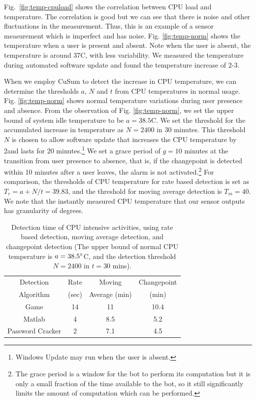 Fig.~\ref{fig:temp-cpuload} shows the correlation between CPU load
and temperature.
The correlation is good but we can see that there is
noise and other fluctuations in the measurement.
Thus, this is an example of a sensor measurement which is imperfect and
has noise.
Fig. \ref{fig:temp-norm} shows the temperature when a user
is present and absent. Note when the user is absent, the temperature
is around 37\degree C, with less variability.  We measured the
temperature during automated software update and found the
temperature increase of 2-3\degree.

When we employ CuSum to detect the increase in CPU temperature, we can determine the thresholds $a$, $N$ and $t$ from CPU temperatures in normal usage. Fig.
\ref{fig:temp-norm} shows normal temperature variations during user
presence and absence. From the observation of Fig.
\ref{fig:temp-norm}, we set the upper bound of system idle
temperature to be $a=38.5$\degree C. We set the threshold for
the accumulated increase in temperature as $N=2400$ in 30 minutes.
This threshold $N$ is chosen to allow software update that increases
the CPU temperature by 2\degree and lasts for 20 minutes.\footnote{
Windows Update may run when the user is absent.
}
We set a grace period of $g=10$ minutes at the transition
from user presence to absence, that is, if the changepoint is
detected within 10 minutes after a user leaves, the alarm is not
activated.\footnote{
The grace period is a window for the bot to perform its computation but
it is only a small fraction of the time available to the bot, so it still
significantly limits the amount of computation which can be performed.
}
For comparison, the thresholds of CPU temperature for rate based detection is set as $T_r = a + N/t = 39.83$\degree, and the threshold for moving average detection is $T_m = 40$\degree. We note that the instantly measured CPU temperature that our sensor outputs has granularity of degrees.

\begin{table}[tb]
\centering
\begin{tabular}{|c|c|c|c|}
\hline
Detection & Rate & Moving & Changepoint \\
Algorithm & (sec) & Average (min) & (min) \\
\hline
Game            & 14 & 11  & 10.4   \\
\hline
Matlab           & 4 & 8.5 & 5.2   \\
\hline
Password Cracker & 2 & 7.1 & 4.5   \\ [0.5ex]
\hline
\end{tabular}
\caption{Detection time of CPU intensive activities,
using rate based detection, moving average detection,
and changepoint detection (The upper bound of normal CPU temperature
is $a=38.5^\circ$C,
and the detection threshold $N=2400$ in $t=30$ mins).}
\label{tbl:detect-CPU}
\end{table}

